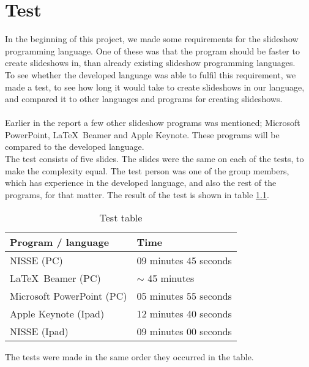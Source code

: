\chapter{Test}
In the beginning of this project, we made some requirements for the slideshow programming language. One of these was that the program should be faster to create slideshows in, than already existing slideshow programming languages. \\
To see whether the developed language was able to fulfil this requirement, we made a test, to see how long it would take to create slideshows in our language, and compared it to other languages and programs for creating slideshows.
\\ \\
Earlier in the report a few other slideshow programs was mentioned; Microsoft PowerPoint, \LaTeX~Beamer and Apple Keynote. These programs will be compared to the developed language.\\
The test consists of five slides. The slides were the same on each of the tests, to make the complexity equal. The test person was one of the group members, which has experience in the developed language, and also the rest of the programs, for that matter.
The result of the test is shown in table \ref{tbl:TestTable}.
\begin{table}
\centering
   \begin{tabular}{ | l | l |}
    \hline
    Program / language & Time \\ \hline
    NISSE (PC) & 09 minutes 45 seconds \\ 
    \LaTeX~Beamer (PC) & $\sim$ 45 minutes \\
    Microsoft PowerPoint (PC) & 05 minutes 55 seconds \\ 
    Apple Keynote (Ipad) & 12 minutes 40 seconds \\ 
    NISSE (Ipad) & 09 minutes 00 seconds \\ \hline
    
    \end{tabular}
    \caption{Test table}
    \label{tbl:TestTable}
\end{table}
The tests were made in the same order they occurred in the table.\\

